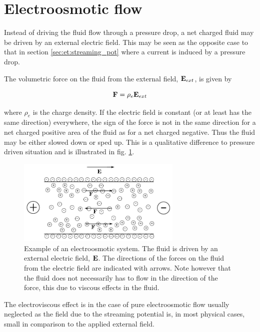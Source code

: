 \section{Electroosmotic flow}\label{sec:et:electroosmosis}
Instead of driving the fluid flow through a pressure drop, a net
charged fluid may be driven by an external electric field. This may
be seen as the opposite case to that in section
\ref{sec:et:streaming_pot} where a current is induced by a pressure
drop.

The volumetric force on the fluid from the external field, $\mathbf{E}_{ext}$,
is given by

\begin{equation}
\mathbf{F} = \mathrm{\rho}_e \mathbf{E}_{ext}
\end{equation}

where $\rho_e$ is the charge density. If the electric field is
constant (or at least has the same direction) everywhere, the sign of
the force is not in the same direction for a net charged positive area
of the fluid as for a net charged negative. Thus the fluid may be
either slowed down or sped up. This is a qualitative difference to
pressure driven situation and is illustrated in fig. \ref{fig:et:eo}.

\begin{figure}
\begin{center}
\includegraphics[width=0.7\textwidth]{fig/channel_electroosmosis.pdf}
\end{center}
\caption[Example of an electroosmotic system.]{Example of an
  electroosmotic system. The fluid is driven by an external electric
  field, $\mathbf{E}$. The directions of the forces on the fluid from the
  electric field are indicated with arrows. Note however that the
  fluid does not necessarily has to flow in the direction of the
  force, this due to viscous effects in the fluid. }
\label{fig:et:eo}
\end{figure}

The electroviscous effect is in the case of pure electroosmotic flow
usually neglected as the field due to the streaming potential is, in
most physical cases, small in comparison to the applied external
field. \cite{wang-poi}
